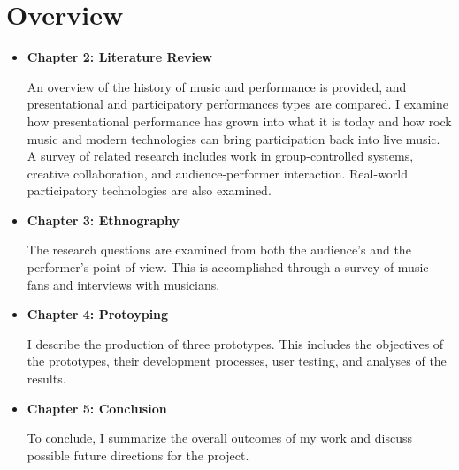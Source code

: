 

\section{Overview}

\begin{itemize}
	\item \textbf{Chapter 2: Literature Review}
	
	An overview of the history of music and performance is provided, and presentational and participatory performances types are compared. I examine how presentational performance has grown into what it is today and how rock music and modern technologies can bring participation back into live music. A survey of related research includes work in group-controlled systems, creative collaboration, and audience-performer interaction. Real-world participatory technologies are also examined.
			
	\item \textbf{Chapter 3: Ethnography}
	
	The research questions are examined from both the audience's and the performer's point of view. This is accomplished through a survey of music fans and interviews with musicians.
	
	\item \textbf{Chapter 4: Protoyping}
	
	I describe the production of three prototypes. This includes the objectives of the prototypes, their development processes, user testing, and analyses of the results.
		
	\item \textbf{Chapter 5: Conclusion}
	
	To conclude, I summarize the overall outcomes of my work and discuss possible future directions for the project.
\end{itemize}
